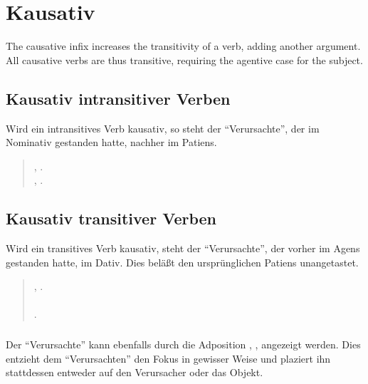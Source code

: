 \section{Kausativ}
\noindent The causative infix  increases the transitivity
of a verb, adding another argument.  All causative verbs are thus
transitive, requiring the agentive case for the subject.
\label{syn:causative}

\subsection{Kausativ intransitiver Verben} Wird ein intransitives Verb kausativ,
so steht der "`Verursachte"', der im Nominativ gestanden hatte, nachher
im Patiens.

\begin{quotation}
\noindent{}, .\\
\noindent{}, .
\end{quotation}

\subsection{Kausativ transitiver Verben} Wird ein transitives Verb kausativ, steht
der "`Verursachte"', der vorher im Agens gestanden hatte, im Dativ. Dies
bel\"a\ss{}t den urspr\"unglichen Patiens unangetastet.
\label{syn:trans-causative}

\begin{quotation}
\noindent{}, .\\
\noindent{}\\
\indent {}. 
\end{quotation}

\subsubsection{} Der "`Verursachte"' kann ebenfalls durch die Adposition ,
, angezeigt werden. Dies entzieht dem "`Verursachten"' den
Fokus in gewisser Weise und plaziert ihn stattdessen entweder auf den Verursacher
oder das Objekt.

